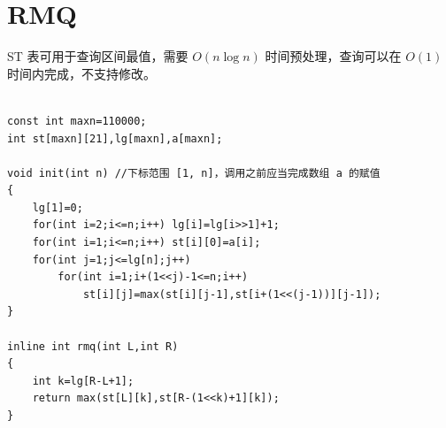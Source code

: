 \section{RMQ}
\par \noindent ST 表可用于查询区间最值，需要 $O(n\log n)$ 时间预处理，查询可以在 $O(1)$ 时间内完成，不支持修改。
\begin{verbatim}

const int maxn=110000;
int st[maxn][21],lg[maxn],a[maxn];

void init(int n) //下标范围 [1, n]，调用之前应当完成数组 a 的赋值
{
    lg[1]=0;
    for(int i=2;i<=n;i++) lg[i]=lg[i>>1]+1;
    for(int i=1;i<=n;i++) st[i][0]=a[i];
    for(int j=1;j<=lg[n];j++)
        for(int i=1;i+(1<<j)-1<=n;i++)
            st[i][j]=max(st[i][j-1],st[i+(1<<(j-1))][j-1]);
}

inline int rmq(int L,int R)
{
    int k=lg[R-L+1];
    return max(st[L][k],st[R-(1<<k)+1][k]);
}
\end{verbatim}